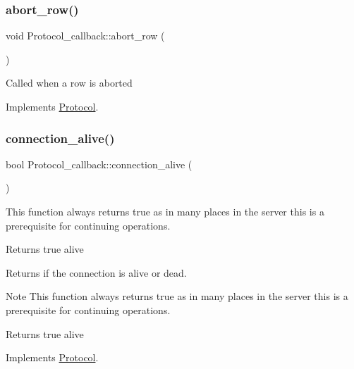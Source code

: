 \subsubsection{\texorpdfstring{abort\+\_\+row()}{abort\_row()}}
{\footnotesize\ttfamily void Protocol\+\_\+callback\+::abort\+\_\+row (\begin{DoxyParamCaption}{ }\end{DoxyParamCaption})\hspace{0.3cm}{\ttfamily [virtual]}}

Called when a row is aborted 

Implements \mbox{\hyperlink{classProtocol}{Protocol}}.

\mbox{\label{classProtocol__callback_a95428a9297fa1eda8fd44a5e1dba65a9}} 
\subsubsection{\texorpdfstring{connection\+\_\+alive()}{connection\_alive()}}
{\footnotesize\ttfamily bool Protocol\+\_\+callback\+::connection\+\_\+alive (\begin{DoxyParamCaption}{ }\end{DoxyParamCaption})\hspace{0.3cm}{\ttfamily [virtual]}}

This function always returns true as in many places in the server this is a prerequisite for continuing operations.

\begin{DoxyReturn}{Returns}
true alive
\end{DoxyReturn}
Returns if the connection is alive or dead.

\begin{DoxyNote}{Note}
This function always returns true as in many places in the server this is a prerequisite for continuing operations.
\end{DoxyNote}
\begin{DoxyReturn}{Returns}
true alive 
\end{DoxyReturn}


Implements \mbox{\hyperlink{classProtocol_af4ed0f36d7e3458766d522432bf4f2d5}{Protocol}}.

\mbox{\label{classProtocol__callback_a9370ee5a33a72f9bfae1fcab09fb3bac}} 
